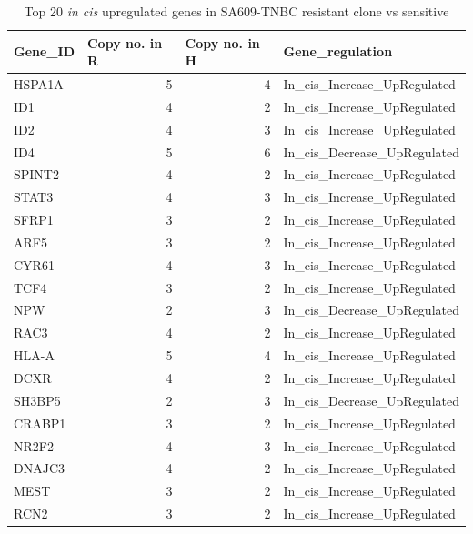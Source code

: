  \begin{table}[htbp]
   \centering
   \caption{Top 20 \textit{in cis} upregulated genes in SA609-TNBC resistant clone vs sensitive}
     
     \begin{tabular}{|l|r|r|l|}
     \hline
     \textbf{Gene\_ID} & \multicolumn{1}{|l|}{ \textbf{Copy no. in R}}& \multicolumn{1}{|l|}{ \textbf{Copy no. in H}} &  \textbf{Gene\_regulation} \\
     \hline
     HSPA1A & 5 & 4 & In\_cis\_Increase\_UpRegulated \\
     ID1 & 4 & 2 & In\_cis\_Increase\_UpRegulated \\
     ID2 & 4 & 3 & In\_cis\_Increase\_UpRegulated \\
     ID4 & 5 & 6 & In\_cis\_Decrease\_UpRegulated \\
     SPINT2 & 4 & 2 & In\_cis\_Increase\_UpRegulated \\
     STAT3 & 4 & 3 & In\_cis\_Increase\_UpRegulated \\
     SFRP1 & 3 & 2 & In\_cis\_Increase\_UpRegulated \\
     ARF5 & 3 & 2 & In\_cis\_Increase\_UpRegulated \\
     CYR61 & 4 & 3 & In\_cis\_Increase\_UpRegulated \\
     TCF4 & 3 & 2 & In\_cis\_Increase\_UpRegulated \\
     NPW & 2 & 3 & In\_cis\_Decrease\_UpRegulated \\
     RAC3 & 4 & 2 & In\_cis\_Increase\_UpRegulated \\
     HLA-A & 5 & 4 & In\_cis\_Increase\_UpRegulated \\
     DCXR & 4 & 2 & In\_cis\_Increase\_UpRegulated \\
     SH3BP5 & 2 & 3 & In\_cis\_Decrease\_UpRegulated \\
     CRABP1 & 3 & 2 & In\_cis\_Increase\_UpRegulated \\
     NR2F2 & 4 & 3 & In\_cis\_Increase\_UpRegulated \\
     DNAJC3 & 4 & 2 & In\_cis\_Increase\_UpRegulated \\
     MEST & 3 & 2 & In\_cis\_Increase\_UpRegulated \\
     RCN2 & 3 & 2 & In\_cis\_Increase\_UpRegulated \\
     
    \hline
     \end{tabular}%
  
   \label{tab:top20SA609upregulated}%
 \end{table}%

